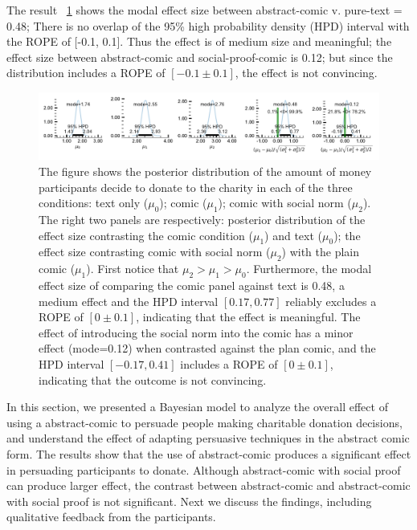 The result ~\ref{fig:main-experiment2-effect} shows the modal effect size between abstract-comic v. pure-text = 0.48; There is no overlap of the 95\% high probability density (HPD) interval with the ROPE of [-0.1, 0.1]. Thus the effect is of medium size and meaningful; the effect size between abstract-comic and social-proof-comic is 0.12; but since the distribution includes a ROPE of $[-0.1 \pm 0.1]$, the effect is not convincing.


\begin{figure}[htb]
	\includegraphics[width=1\textwidth]{./hari-code/new_exp_text_v_comic_v_social.pdf}
    \caption{The figure shows the posterior distribution of the amount of money participants decide to donate to the charity in each of the three conditions: text only ($\mu_0$); comic ($\mu_1$); comic with social norm ($\mu_2$). The right two panels are respectively: posterior distribution of the effect size contrasting the comic condition ($\mu_1$) and text ($\mu_0$); the effect size contrasting comic with social norm ($\mu_2$) with the plain comic ($\mu_1$). First notice that $\mu_2 > \mu_1 > \mu_0$. Furthermore, the modal effect size of comparing the comic panel against text is 0.48, a medium effect and the HPD interval $[0.17, 0.77]$ reliably excludes a ROPE of $[0 \pm 0.1]$, indicating that the effect is meaningful. The effect of introducing the social norm into the comic has a minor effect (mode=0.12) when contrasted against the plan comic, and the HPD interval $[-0.17, 0.41]$ includes a ROPE of $[0 \pm 0.1]$, indicating that the outcome is not convincing.}
	\label{fig:main-experiment2-effect}
\end{figure}


In this section, we presented a Bayesian model to analyze the overall effect of using a abstract-comic to persuade people making charitable donation decisions, and understand the effect of adapting persuasive techniques in the abstract comic form. The results show that the use of abstract-comic produces a significant effect in persuading participants to donate. Although abstract-comic with social proof can produce larger effect, the contrast between abstract-comic and abstract-comic with social proof is not significant. Next we discuss the findings, including qualitative feedback from the participants.
